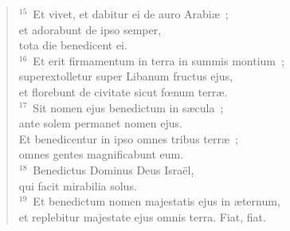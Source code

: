\begin{flushleft}
\begin{verse}
${}^{15}$~Et vivet, et dabitur ei de auro Arabi\ae~;\\ et adorabunt de ipso semper,\\ tota die benedicent ei.\\
${}^{16}$~Et erit firmamentum in terra in summis montium~;\\ superextolletur super Libanum fructus ejus,\\ et florebunt de civitate sicut fœnum terr\ae .\\
${}^{17}$~Sit nomen ejus benedictum in s\ae cula~;\\ ante solem permanet nomen ejus.\\ Et benedicentur in ipso omnes tribus terr\ae~;\\ omnes gentes magnificabunt eum.\\
${}^{18}$~Benedictus Dominus Deus Isra\"el,\\ qui facit mirabilia solus.\\
${}^{19}$~Et benedictum nomen majestatis ejus in \ae ternum,\\ et replebitur majestate ejus omnis terra. Fiat, fiat.\end{verse}\end{flushleft}


